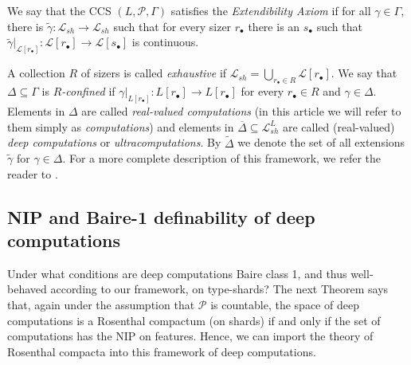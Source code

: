 \documentclass[psamsfonts]{amsart}
\theoremstyle{definition}
\theoremstyle{remark}
\numberwithin{equation}{section}
\begin{document}
We say that the CCS $(L,\mathcal P,\Gamma)$ satisfies the \emph{Extendibility Axiom} if for all $\gamma\in \Gamma$, there is $\tilde\gamma:\mathcal L_{sh}\to\mathcal L_{sh}$ such that for every sizer $r_{\bullet}$ there is an $s_\bullet$ such that $\tilde\gamma|_{\mathcal L[r_\bullet]}:\mathcal L[r_\bullet]\to\mathcal L[s_\bullet]$ is continuous.

A collection $R$ of sizers is called \emph{exhaustive} if $\mathcal{L}_{sh}=\bigcup_{r_{\bullet}\in R}\mathcal{L}[r_\bullet]$. We say that $\Delta\subseteq\Gamma$ is \emph{$R$-confined} if $\gamma|_{L[r_\bullet]}:L[r_\bullet]\to L[r_\bullet]$ for every $r_\bullet\in R$ and $\gamma\in \Delta$. Elements in $\Delta$ are called \emph{real-valued computations} (in this article we will refer to them simply as \emph{computations}) and elements in $\overline{\Delta}\subseteq \mathcal L_{sh}^L$ are called (real-valued) \emph{deep computations} or \emph{ultracomputations}. By $\tilde{\Delta}$ we denote the set of all extensions $\tilde\gamma$ for $\gamma\in\Delta$. For a more complete description of this framework, we refer the reader to \cite{alva2024approximability}.

\subsection{NIP and Baire-1 definability of deep computations}

Under what conditions are deep computations Baire class 1, and thus well-behaved according to our framework, on type-shards? The next Theorem says that, again under the assumption that $\mathcal{P}$ is countable, the space of deep computations is a Rosenthal compactum (on shards) if and only if the set of computations has the NIP on features. Hence, we can import the theory of Rosenthal compacta into this framework of deep computations.
\end{document}
